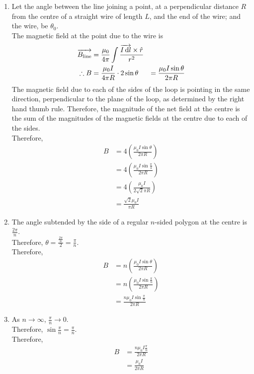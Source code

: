 \documentclass[fleqn, a4paper, 11pt, oneside]{amsart}
\theoremstyle{definition}
\theoremstyle{theorem}
\begin{document}
\begin{solution}
	\begin{enumerate}[leftmargin = *]
		\item
			Let the angle between the line joining a point, at a perpendicular distance $R$ from the centre of a straight wire of length $L$, and the end of the wire; and the wire, be $\theta_0$.\\
			The magnetic field at the point due to the wire is
			\begin{align*}
				\overrightarrow{B_{\textnormal{line}}} &= \frac{\mu_0}{4 \pi} \int \frac{\overrightarrow{I \dif l} \times \hat{r}}{r^2}\\
				\therefore B &= \frac{\mu_0 I}{4 \pi R} \cdot 2 \sin \theta
				&= \frac{\mu_0 I \sin \theta}{2 \pi R}
			\end{align*}
			The magnetic field due to each of the sides of the loop is pointing in the same direction, perpendicular to the plane of the loop, as determined by the right hand thumb rule.
			Therefore, the magnitude of the net field at the centre is the sum of the magnitudes of the magnetic fields at the centre due to each of the sides.\\
			Therefore,
			\begin{align*}
				B &= 4 \left( \frac{\mu_0 I \sin \theta}{2 \pi R} \right)\\
				&= 4 \left( \frac{\mu_0 I \sin \frac{\pi}{4}}{2 \pi R} \right)\\
				&= 4 \left( \frac{\mu_0 I}{2 \sqrt{2} \pi R} \right)\\
				&= \frac{\sqrt{2} \mu_0 I}{\pi R}
			\end{align*}
		\item
			The angle subtended by the side of a regular $n$-sided polygon at the centre is $\frac{2 \pi}{n}$.\\
			Therefore, $\theta = \frac{\frac{2 \pi}{n}}{2} = \frac{\pi}{n}$.\\
			Therefore,
			\begin{align*}
				B &= n \left( \frac{\mu_0 I \sin \theta}{2 \pi R} \right)\\
				&= n \left( \frac{\mu_0 I \sin \frac{\pi}{n}}{2 \pi R} \right)\\
				&= \frac{n \mu_0 I \sin \frac{\pi}{n}}{2 \pi R}
			\end{align*}
		\item
			As $n \to \infty$, $\frac{\pi}{n} \to 0$.\\
			Therefore, $\sin \frac{\pi}{n} = \frac{\pi}{n}$.\\
			Therefore,
			\begin{align*}
				B &= \frac{n \mu_0 I \frac{\pi}{n}}{2 \pi R}\\
				&= \frac{\mu_0 I}{2 \pi R}
			\end{align*}
	\end{enumerate}
\end{solution}
\end{document}
